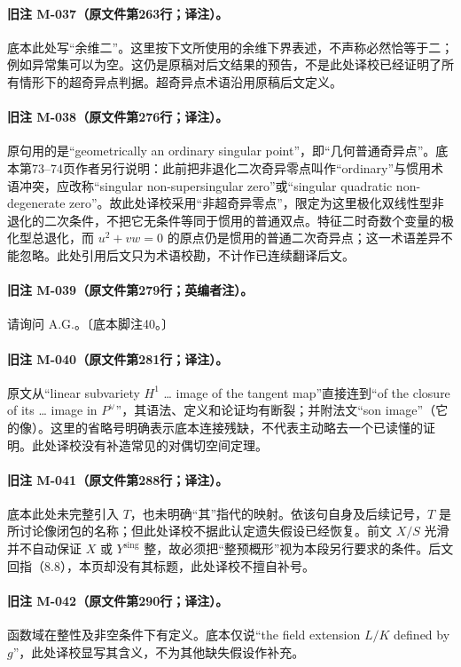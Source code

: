\paragraph{旧注 M-037（原文件第263行；译注）。}
底本此处写“余维二”。这里按下文所使用的余维下界表述，不声称必然恰等于二；例如异常集可以为空。这仍是原稿对后文结果的预告，不是此处译校已经证明了所有情形下的超奇异点判据。超奇异点术语沿用原稿后文定义。

\paragraph{旧注 M-038（原文件第276行；译注）。}
原句用的是“geometrically an ordinary singular point”，即“几何普通奇异点”。底本第73--74页作者另行说明：此前把非退化二次奇异零点叫作“ordinary”与惯用术语冲突，应改称“singular non-supersingular zero”或“singular quadratic non-degenerate zero”。故此处译校采用“非超奇异零点”，限定为这里极化双线性型非退化的二次条件，不把它无条件等同于惯用的普通双点。特征二时奇数个变量的极化型总退化，而 $u^2+vw=0$ 的原点仍是惯用的普通二次奇异点；这一术语差异不能忽略。此处引用后文只为术语校勘，不计作已连续翻译后文。

\paragraph{旧注 M-039（原文件第279行；英编者注）。}
请询问 A.G.。〔底本脚注40。〕

\paragraph{旧注 M-040（原文件第281行；译注）。}
原文从“linear subvariety $H^1$ … image of the tangent map”直接连到“of the closure of its … image in $P^\vee$”，其语法、定义和论证均有断裂；并附法文“son image”（它的像）。这里的省略号明确表示底本连接残缺，不代表主动略去一个已读懂的证明。此处译校没有补造常见的对偶切空间定理。

\paragraph{旧注 M-041（原文件第288行；译注）。}
底本此处未完整引入 $T$，也未明确“其”指代的映射。依该句自身及后续记号，$T$ 是所讨论像闭包的名称；但此处译校不据此认定遗失假设已经恢复。前文 $X/S$ 光滑并不自动保证 $X$ 或 ${Y^{\mathrm{sing}}}$ 整，故必须把“整预概形”视为本段另行要求的条件。后文回指（8.8），本页却没有其标题，此处译校不擅自补号。

\paragraph{旧注 M-042（原文件第290行；译注）。}
函数域在整性及非空条件下有定义。底本仅说“the field extension $L/K$ defined by $g$”，此处译校显写其含义，不为其他缺失假设作补充。

